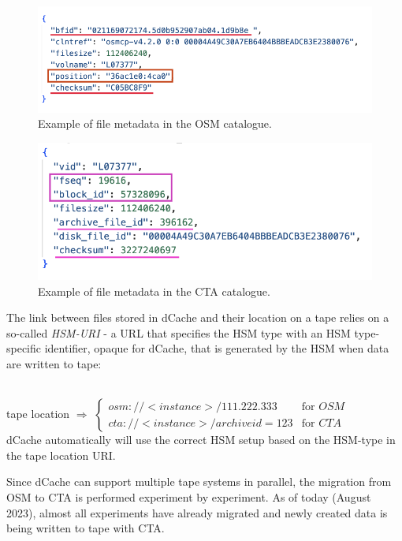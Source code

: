 \documentclass{webofc}
\begin{document}
\begin{figure}[h]
    \centering
    \includegraphics[scale=0.60]{osm-schema.png}
    \caption{Example of file metadata in the OSM catalogue.}
    \label{fig:osm_entry_example}
\end{figure}

\begin{figure}[h]
    \centering
    \includegraphics[scale=0.60]{cta-schema.png}
    \caption{Example of file metadata in the CTA catalogue.}
    \label{fig:cta_entry_example}
\end{figure}

The link between files stored in dCache and their location on a tape relies on a so-called \textit{HSM-URI} - a URL that specifies the HSM type with an HSM type-specific identifier, opaque for dCache, that is generated by the HSM when data are written to tape:

~\\
tape location $\Rightarrow$ $\begin{cases}
    osm://<instance>/111.222.333 &\text{for } OSM \\
    cta://<instance>/archiveid=123 &\text{for } CTA
\end{cases}$
~\\

dCache automatically will use the correct HSM setup based on the HSM-type in the tape location URI.

Since dCache can support multiple tape systems in parallel, the migration from OSM to CTA is performed experiment by experiment. As of today (August 2023), almost all experiments have already migrated and newly created data is being written to tape with CTA.
\end{document}
